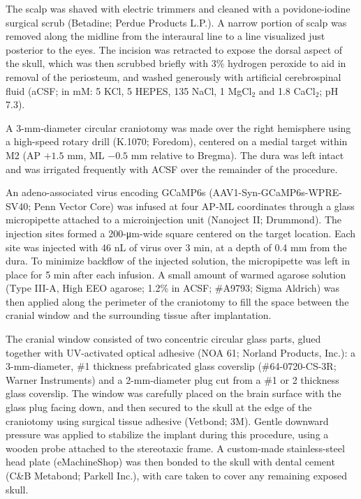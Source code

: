 The scalp was shaved with electric trimmers and cleaned with a povidone-iodine surgical scrub (Betadine; Perdue Products L.P.). A narrow portion of scalp was removed along the midline from the interaural line to a line visualized just posterior to the eyes. The incision was retracted to expose the dorsal aspect of the skull, which was then scrubbed briefly with 3\% hydrogen peroxide to aid in removal of the periosteum, and washed generously with artificial cerebrospinal fluid (aCSF; in mM: 5 KCl, 5 HEPES, 135 NaCl, 1 MgCl$_2$ and 1.8 CaCl$_2$; pH 7.3). 

A 3-mm-diameter circular craniotomy was made over the right hemisphere using a high-speed rotary drill (K.1070; Foredom), centered on a medial target within M2 (AP $+1.5$ mm, ML $-0.5$ mm relative to Bregma). The dura was left intact and was irrigated frequently with ACSF over the remainder of the procedure. 

An adeno-associated virus encoding GCaMP6s (AAV1-Syn-GCaMP6s-WPRE-SV40; Penn Vector Core) was infused at four AP-ML coordinates through a glass micropipette attached to a microinjection unit (Nanoject II; Drummond). The injection sites formed a 200-\unit{\micro\meter}-wide square centered on the target location. Each site was injected with 46 nL of virus over 3 min, at a depth of 0.4 mm from the dura. To minimize backflow of the injected solution, the micropipette was left in place for 5 min after each infusion. A small amount of warmed agarose solution (Type III-A, High EEO agarose; 1.2\% in ACSF; \#A9793; Sigma Aldrich) was then applied along the perimeter of the craniotomy to fill the space between the cranial window and the surrounding tissue after implantation. 

The cranial window consisted of two concentric circular glass parts, glued together with UV-activated optical adhesive (NOA 61; Norland Products, Inc.): a 3-mm-diameter, \#1 thickness prefabricated glass coverslip (\#64-0720-CS-3R; Warner Instruments) and a 2-mm-diameter plug cut from a \#1 or 2 thickness glass coverslip. The window was carefully placed on the brain surface with the glass plug facing down, and then secured to the skull at the edge of the craniotomy using surgical tissue adhesive (Vetbond; 3M). Gentle downward pressure was applied to stabilize the implant during this procedure, using a wooden probe attached to the stereotaxic frame. A custom-made stainless-steel head plate (eMachineShop) was then bonded to the skull with dental cement (C\&B Metabond; Parkell Inc.), with care taken to cover any remaining exposed skull. 

